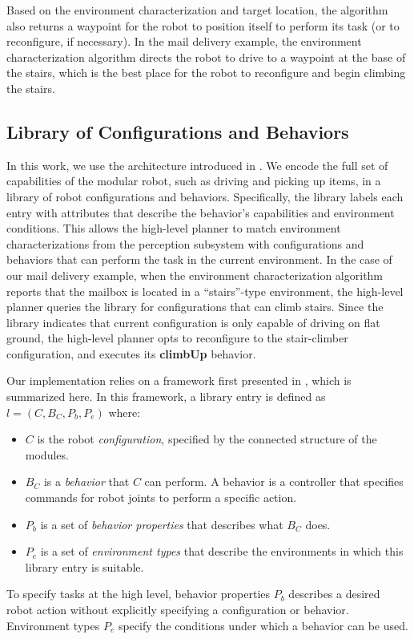 \documentclass[12pt]{article}
\begin{document}
Based on the environment characterization and target location, the algorithm also returns a waypoint for the robot to position itself to perform its task (or to reconfigure, if necessary).  In the mail delivery example, the environment characterization algorithm directs the robot to drive to a waypoint at the base of the stairs, which is the best place for the robot to reconfigure and begin climbing the stairs.

%
\subsection{Library of Configurations and Behaviors}
\label{sec:configuration-specifics}
%
In this work, we use the architecture introduced in \cite{Jing2016}. We encode the full set of capabilities of the modular robot, such as driving and picking up items, in a library of robot configurations and behaviors.
Specifically, the library labels each entry with attributes that describe the behavior's capabilities and environment conditions. 
This allows the high-level planner to match environment characterizations from the perception subsystem with configurations and behaviors that can perform the task in the current environment. 
In the case of our mail delivery example, when the environment characterization algorithm reports that the mailbox is located in a ``stairs''-type environment, the high-level planner queries the library for configurations that can climb stairs.  
Since the library indicates that current configuration is only capable of driving on flat ground, the high-level planner opts to reconfigure to the stair-climber configuration, and executes its \textbf{climbUp} behavior.

Our implementation relies on a framework first presented in \cite{Jing2016}, which is summarized here.
In this framework, a library entry is defined as $l = (C,B_C,P_b,P_e)$ where:
\begin{itemize}
\item $C$ is the robot \emph{configuration}, specified by the connected structure of the modules.
\item $B_C$ is a \emph{behavior} that $C$ can perform. A behavior is a controller that specifies commands for robot joints to perform a specific action. 
\item $P_b$ is a set of \emph{behavior properties} that describes what $B_C$ does. 
\item $P_e$ is a set of \emph{environment types} that describe the environments in which this library entry is suitable. 
\end{itemize} 
%
To specify tasks at the high level, behavior properties $P_b$ describes a desired robot action without explicitly specifying a configuration or behavior.
Environment types $P_e$ specify the conditions under which a behavior can be used.
\end{document}
